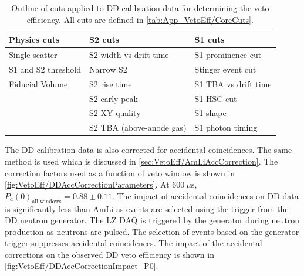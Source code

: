 \begin{table}[!ht]
	\centering
	\caption{Outline of cuts applied to DD calibration data for determining the veto efficiency. All cuts are defined in \autoref{tab:App_VetoEff/CoreCuts}.}
	\begin{tabular}{lll}
    \hline\hline
	\textbf{Physics cuts}&\textbf{S2 cuts}&\textbf{S1 cuts} \\
	\hline
	Single scatter & S2 width vs drift time & S1 prominence cut \\
	S1 and S2 threshold & Narrow S2 & Stinger event cut \\
	Fiducial Volume & S2 rise time & S1 TBA vs drift time \\
	& S2 early peak & S1 HSC cut \\
	& S2 XY quality & S1 shape \\
	& S2 TBA (above-anode gas) & S1 photon timing \\
    \hline\hline
	\end{tabular}
	\label{tab:VetoEff/dd_efficiency_cuts}
\end{table}
The DD calibration data is also corrected for accidental coincidences. The same method is used which is discussed in \autoref{sec:VetoEff/AmLiAccCorrection}. The correction factors used as a function of veto window is shown in \autoref{fig:VetoEff/DDAccCorrectionParameters}. At $600~\mu\text{s}$, $P_a(0)_{\text{all windows}}=0.88\pm0.11$. The impact of accidental coincidences on DD data is significantly less than AmLi as events are selected using the trigger from the DD neutron generator. The LZ DAQ is triggered by the generator during neutron production as neutrons are pulsed. The selection of events based on the generator trigger suppresses accidental coincidences. The impact of the accidental corrections on the observed DD veto efficiency is shown in \autoref{fig:VetoEff/DDAccCorrectionImpact_P0}.
